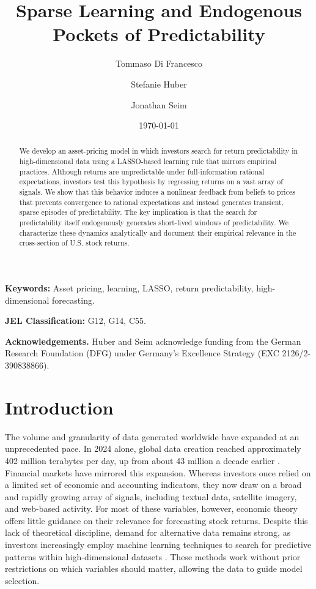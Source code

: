 \documentclass[11pt]{article}
\title{\textbf{Sparse Learning and Endogenous Pockets of Predictability}}
\author[1]{Tommaso Di Francesco}
\author[1]{Stefanie Huber}
\author[2]{Jonathan Seim}
\affil[1]{University of Bonn}
\affil[2]{University of Cologne}
\date{\today}
\begin{document}
\maketitle

\begin{abstract}
\noindent
We develop an asset-pricing model in which investors search for return predictability in high-dimensional data using a LASSO-based learning rule that mirrors empirical practices.
Although returns are unpredictable under full-information rational expectations, investors test this hypothesis by regressing returns on a vast array of signals.
We show that this behavior induces a nonlinear feedback from beliefs to prices that prevents convergence to rational expectations and instead generates transient, sparse episodes of predictability.
The key implication is that the search for predictability itself endogenously generates short-lived windows of predictability.
We characterize these dynamics analytically and document their empirical relevance in the cross-section of U.S. stock returns.
\end{abstract}

\vspace{0.5cm}

\noindent\textbf{Keywords:} Asset pricing, learning, LASSO, return predictability, high-dimensional forecasting.  

\noindent\textbf{JEL Classification:} G12, G14, C55.

\vspace{1.0cm}

\noindent\textbf{Acknowledgements.}
Huber and Seim acknowledge funding from the German Research Foundation (DFG) under Germany’s Excellence Strategy (EXC 2126/2-390838866).

\newpage

\section{Introduction}


The volume and granularity of data generated worldwide have expanded at an unprecedented pace. 
In 2024 alone, global data creation reached approximately 402 million terabytes per day, up from about 43 million a decade earlier \citep{DataSphere2025}. 
Financial markets have mirrored this expansion. Whereas investors once relied on a limited set of economic and accounting indicators, they now draw on a broad and rapidly growing array of signals, including textual data, satellite imagery, and web-based activity. 
For most of these variables, however, economic theory offers little guidance on their relevance for forecasting stock returns. 
Despite this lack of theoretical discipline, demand for alternative data remains strong, as investors increasingly employ machine learning techniques to search for predictive patterns within high-dimensional datasets  \citep{Invesco2024IGSIS}. 
These methods work without prior restrictions on which variables should matter, allowing the data to guide model selection.
\end{document}
